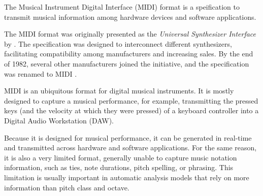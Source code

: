


The Musical Instrument Digital Interface (MIDI) format is a
speification to transmit musical information among hardware
devices and software applications.

The MIDI format was originally presented as the
\emph{Universal Synthesizer Interface} by
\textcite{smith1981universal}. The specification was
designed to interconnect different synthesizers,
facilitating compatibility among manufacturers and
increasing sales. By the end of 1982, several other
manufacturers joined the initiative, and the specification
was renamed to MIDI \parencite{moog1986midi}.


MIDI is an ubiquitous format for digital musical instruments. It is mostly designed to capture a musical performance, for example, transmitting the pressed keys (and the velocity at which they were pressed) of a keyboard controller into a Digital Audio Workstation (DAW).

Because it is designed for musical performance, it can be generated in real-time and transmitted across hardware and software applications. For the same reason, it is also a very limited format, generally unable to capture music notation information, such as ties, note durations, pitch spelling, or phrasing. This limitation is usually important in automatic analysis models that rely on more information than pitch class and octave.


